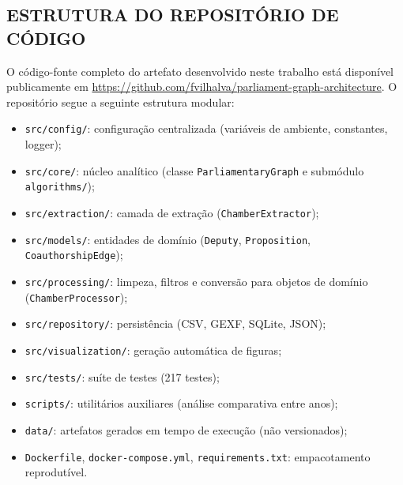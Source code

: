 \documentclass[
      12pt,
      a4paper,
      openright,
      oneside,
      chapter=TITLE,
      section=TITLE,
      english,
      french,
      spanish,
      brazilian
    ]{abntex2}
\begin{document}
        \begin{apendicesenv}
    
            \chapter{ESTRUTURA DO REPOSITÓRIO DE CÓDIGO}
    
            O código-fonte completo do artefato desenvolvido neste trabalho está
            disponível publicamente em
            \url{https://github.com/fvilhalva/parliament-graph-architecture}. O
            repositório segue a seguinte estrutura modular:
    
            \begin{itemize}
                \item \texttt{src/config/}: configuração centralizada (variáveis de ambiente, constantes, logger);
                \item \texttt{src/core/}: núcleo analítico (classe \texttt{ParliamentaryGraph} e submódulo \texttt{algorithms/});
                \item \texttt{src/extraction/}: camada de extração (\texttt{ChamberExtractor});
                \item \texttt{src/models/}: entidades de domínio (\texttt{Deputy}, \texttt{Proposition}, \texttt{CoauthorshipEdge});
                \item \texttt{src/processing/}: limpeza, filtros e conversão para objetos de domínio (\texttt{ChamberProcessor});
                \item \texttt{src/repository/}: persistência (CSV, GEXF, SQLite, JSON);
                \item \texttt{src/visualization/}: geração automática de figuras;
                \item \texttt{src/tests/}: suíte de testes (217 testes);
                \item \texttt{scripts/}: utilitários auxiliares (análise comparativa entre anos);
                \item \texttt{data/}: artefatos gerados em tempo de execução (não versionados);
                \item \texttt{Dockerfile}, \texttt{docker-compose.yml}, \texttt{requirements.txt}: empacotamento reprodutível.
            \end{itemize}
    
        \end{apendicesenv}
    
\end{document}
